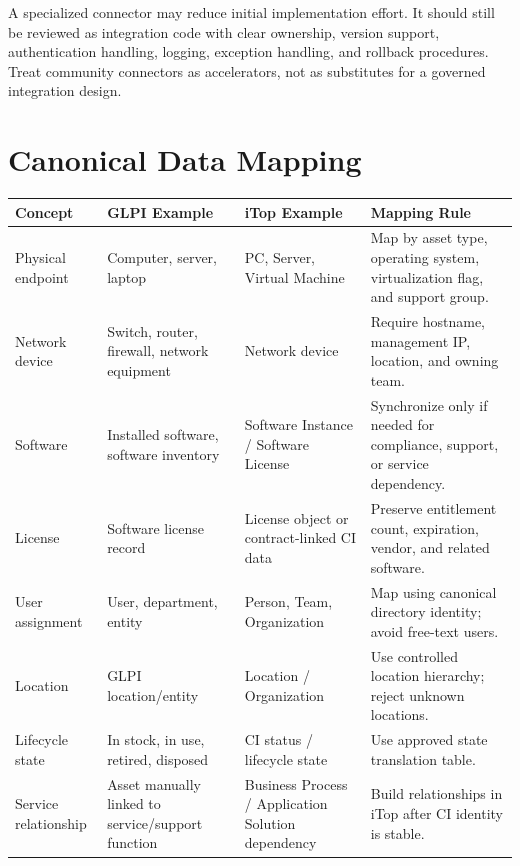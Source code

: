 \documentclass[11pt]{article}
\begin{document}
A specialized connector may reduce initial implementation effort. It should still be reviewed as integration code with clear ownership, version support, authentication handling, logging, exception handling, and rollback procedures. Treat community connectors as accelerators, not as substitutes for a governed integration design.

\section{Canonical Data Mapping}

\begin{longtable}{>{\raggedright\arraybackslash}p{\dimexpr 0.21348\dimexpr\linewidth-8\tabcolsep\relax\relax}>{\raggedright\arraybackslash}p{\dimexpr 0.28090\dimexpr\linewidth-8\tabcolsep\relax\relax}>{\raggedright\arraybackslash}p{\dimexpr 0.28090\dimexpr\linewidth-8\tabcolsep\relax\relax}>{\raggedright\arraybackslash}p{\dimexpr 0.22472\dimexpr\linewidth-8\tabcolsep\relax\relax}}
\toprule
\rowcolor{LightBlue}\textbf{Concept} & \textbf{GLPI Example} & \textbf{iTop Example} & \textbf{Mapping Rule} \\
\midrule
Physical endpoint & Computer, server, laptop & PC, Server, Virtual Machine & Map by asset type, operating system, virtualization flag, and support group. \\
Network device & Switch, router, firewall, network equipment & Network device & Require hostname, management IP, location, and owning team. \\
Software & Installed software, software inventory & Software Instance / Software License & Synchronize only if needed for compliance, support, or service dependency. \\
License & Software license record & License object or contract-linked CI data & Preserve entitlement count, expiration, vendor, and related software. \\
User assignment & User, department, entity & Person, Team, Organization & Map using canonical directory identity; avoid free-text users. \\
Location & GLPI location/entity & Location / Organization & Use controlled location hierarchy; reject unknown locations. \\
Lifecycle state & In stock, in use, retired, disposed & CI status / lifecycle state & Use approved state translation table. \\
Service relationship & Asset manually linked to service/support function & Business Process / Application Solution dependency & Build relationships in iTop after CI identity is stable. \\
\bottomrule
\end{longtable}
\end{document}
